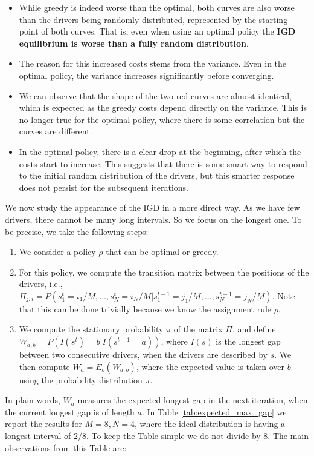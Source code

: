 \documentclass[12pt,english]{article}
\begin{document}
{\begin{itemize}
    
    \item While greedy is indeed worse than the optimal, both curves are also worse than the drivers being randomly distributed, represented by the starting point of both curves. That is, even when using an optimal policy the \textbf{IGD equilibrium is worse than a fully random distribution}.
    \item The reason for this increased costs stems from the variance. Even in the optimal policy, the variance increases significantly before converging.
    \item We can observe that the shape of the two red curves are almost identical, which is expected as the greedy costs depend directly on the variance. This is no longer true for the optimal policy, where there is some correlation but the curves are different.
    \item In the optimal policy, there is a clear drop at the beginning, after which the costs start to increase. This suggests that there is some smart way to respond to the initial random distribution of the drivers, but this smarter response does not persist for the subsequent iterations.
    
\end{itemize}

We now study the appearance of the IGD in a more direct way. As we have few drivers, there cannot be many long intervals. So we focus on the longest one. To be precise, we take the following steps:
\begin{enumerate}
    \item We consider a policy $\rho$ that can be optimal or greedy.
    \item For this policy, we compute the transition matrix between the positions of the drivers, i.e., $\Pi_{j,i}=P(s^t_1=i_1/M,\ldots,s^t_N=i_N/M|s^{t-1}_1=j_1/M,\ldots,s^{t-1}_N=j_N/M)$. Note that this can be done trivially because we know the assignment rule $\rho$.
    \item We compute the stationary probability $\pi$ of the matrix $\Pi$, and define $W_{a,b}=P(I(s^t)=b|I(s^{t-1}=a))$, where $I(s)$ is the longest gap between two consecutive drivers, when the drivers are described by $s$. We then compute $W_a=E_b(W_{a,b})$, where the expected value is taken over $b$ using the probability distribution $\pi$.
\end{enumerate}

In plain words, $W_a$ measures the expected longest gap in the next iteration, when the current longest gap is of length $a$. In Table \ref{tab:expected_max_gap} we report the results for $M=8,N=4$, where the ideal distribution is having a longest interval of $2/8$. To keep the Table simple we do not divide by 8. The main observations from this Table are:


}
\end{document}
